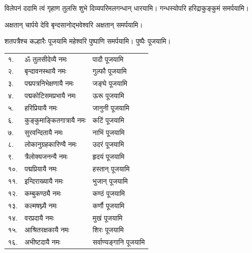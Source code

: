 {विलेपनं ददामि त्वं गृहाण तुलसि शुभे}
 दिव्यपरिमलगन्धान् धारयामि। गन्धस्योपरि हरिद्राकुङ्कुमं समर्पयामि। 

{अक्षतान् चार्पये देवि बृन्दसानोद्भवेश्वरि}
अक्षतान् समर्पयामि।\medskip

{शतपत्रैश्च कल्हारैः पूजयामि महेश्वरि}
 पुष्पाणि समर्पयामि।  पुष्पैः पूजयामि।

\begin{longtable}{ll@{— }l}
१.& ॐ तुलसीदेव्यै नमः & पादौ पूजयामि \\
२.& बृन्दावनस्थायै नमः & गुल्फौ पूजयामि\\
३.& पद्मपत्रनिभेक्षणायै नमः & जङ्घे पूजयामि  \\
४.& पद्मकोटिसमप्रभायै नमः & ऊरू पूजयामि\\
५.& हरिप्रियायै नमः & जानुनी पूजयामि   \\
६.& कुङ्कुमाङ्कितगात्रायै नमः & कटिं पूजयामि \\
७.& सुरवन्दितायै नमः & नाभिं पूजयामि        \\
८.& लोकानुग्रहकारिण्यै नमः & उदरं पूजयामि\\
९.& त्रैलोक्यजनन्यै नमः & हृदयं पूजयामि    \\
१०.& पद्मप्रियायै नमः & हस्तान् पूजयामि\\
११.& इन्दिराख्यायै नमः & भुजान् पूजयामि\\
१२.& कम्बुकण्ठ्यै नमः & कण्ठं पूजयामि\\
१३.& कल्मषघ्न्यै नमः & कर्णौ पूजयामि  \\
१४.& वरप्रदायै नमः & मुखं  पूजयामि\\
१५.& आश्रितरक्षकायै नमः & शिरः पूजयामि\\
१६.& अभीष्टदायै नमः & सर्वाण्यङ्गानि पूजयामि   \\
\end{longtable}

